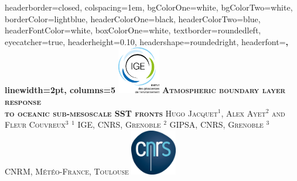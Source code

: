 \documentclass[portrait,a0paper,fontscale=0.285, margin=30mm]{baposter} %
\begin{document}
\begin{poster}
{
headerborder=closed, %
colspacing=1em, %
bgColorOne=white, %
bgColorTwo=white, %
borderColor=lightblue, %
headerColorOne=black, %
headerColorTwo=blue, %
headerFontColor=white, %
boxColorOne=white, %
textborder=roundedleft, %
eyecatcher=true, %
headerheight=0.10\textheight, %
headershape=roundedright, %
headerfont=\Large\bf\textsc, %
linewidth=2pt, %
columns=5
}
%
{\includegraphics[width=0.14\textwidth]{figures hugo/logoIGE.png}} %
{{\fontsize{16}{40}\selectfont\bf\textsc{Atmospheric boundary layer response \\ to oceanic sub-mesoscale SST fronts}}  } %
{\Centering\textsc{\fontsize{13}{40}\selectfont\textsc{Hugo Jacquet$^{1}$, Alex Ayet$^2$ and Fleur Couvreux$^3$}   \vspace{0.3em}\newline 
 {\fontsize{9.}{40}\selectfont$^1$ IGE, CNRS, Grenoble}
  {\fontsize{9.}{40}\selectfont$^2$ GIPSA, CNRS, Grenoble}
   {\fontsize{9.}{40}\selectfont$^3$ CNRM, Météo-France, Toulouse}}}
{\includegraphics[width=0.15\textwidth]{figures hugo/logoCNRS.png}} %


\end{poster}
\end{document}
